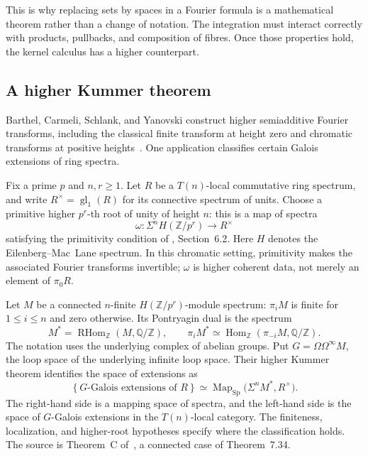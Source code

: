 \documentclass[11pt]{article}
\theoremstyle{remark}
\begin{document}
This is why replacing sets by spaces in a Fourier formula is a mathematical theorem rather than a change of notation. The integration must interact correctly with products, pullbacks, and composition of fibres. Once those properties hold, the kernel calculus has a higher counterpart.

\subsection{A higher Kummer theorem}

Barthel, Carmeli, Schlank, and Yanovski construct higher semiadditive Fourier transforms, including the classical finite transform at height zero and chromatic transforms at positive heights~\cite{chromatic}. One application classifies certain Galois extensions of ring spectra.

Fix a prime \(p\) and \(n,r\geq1\). Let \(R\) be a \(T(n)\)-local commutative ring spectrum, and write \(R^\times=\operatorname{gl}_1(R)\) for its connective spectrum of units. Choose a primitive higher \(p^r\)-th root of unity of height \(n\): this is a map of spectra
\[
\omega:\Sigma^n H(\mathbb Z/p^r)\longrightarrow R^\times
\]
satisfying the primitivity condition of \cite{chromatic}, Section~6.2. Here \(H\) denotes the Eilenberg--Mac~Lane spectrum. In this chromatic setting, primitivity makes the associated Fourier transforms invertible; \(\omega\) is higher coherent data, not merely an element of \(\pi_0R\).

Let \(M\) be a connected \(n\)-finite \(H(\mathbb Z/p^r)\)-module spectrum: \(\pi_iM\) is finite for \(1\leq i\leq n\) and zero otherwise. Its Pontryagin dual is the spectrum
\[
M^*=\operatorname{RHom}_{\mathbb Z}(M,\mathbb Q/\mathbb Z),
\qquad
\pi_iM^*\simeq\operatorname{Hom}_{\mathbb Z}(\pi_{-i}M,\mathbb Q/\mathbb Z).
\]
The notation uses the underlying complex of abelian groups. Put \(G=\Omega\Omega^\infty M\), the loop space of the underlying infinite loop space. Their higher Kummer theorem identifies the space of extensions as
\begin{equation}
\left\{G\text{-Galois extensions of }R\right\}
\simeq
\operatorname{Map}_{\mathrm{Sp}}\bigl(\Sigma^n M^*,R^\times\bigr).
\label{higher:kummer}
\end{equation}
The right-hand side is a mapping space of spectra, and the left-hand side is the space of \(G\)-Galois extensions in the \(T(n)\)-local category. The finiteness, localization, and higher-root hypotheses specify where the classification holds. The source is Theorem~C of~\cite{chromatic}, a connected case of Theorem~7.34.
\end{document}
